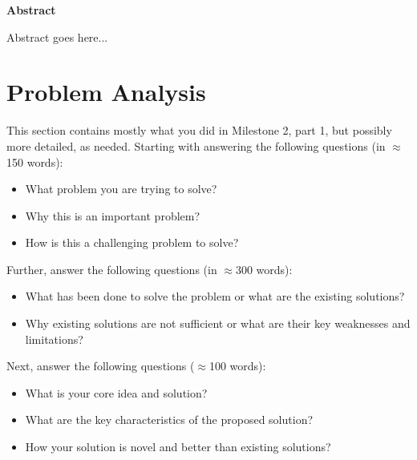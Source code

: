 \documentclass[12pt]{article}
\begin{document}
\clearpage\thispagestyle{empty}

	\vspace{1cm}
		\begin{center}
\textbf{Abstract}\\
		\end{center}
	\vspace{1cm}
{\normalsize Abstract goes here...\par}
\clearpage\thispagestyle{empty}
\tableofcontents{}
\clearpage\thispagestyle{empty}

\section{Problem Analysis}\label{chap:introduction}

This section contains mostly what you did in Milestone 2, part 1, but possibly more detailed, as needed. 
Starting with answering the following questions (in $\approx$150 words):
\begin{itemize}
    \item What problem you are trying to solve? 
    \item Why this is an important problem?
    \item How is this a challenging problem to solve? 
\end{itemize}

Further, answer the following questions (in $\approx$300 words):
\begin{itemize}
    \item What has been done to solve the problem or what are the existing solutions?
    \item Why existing solutions are not sufficient or what are their key weaknesses and limitations?
\end{itemize}

Next, answer the following questions ($\approx$100 words):
\begin{itemize}
    \item What is your core idea and solution? 
    \item What are the key characteristics of the proposed solution? 
    \item How your solution is novel and better than existing solutions? 
\end{itemize}
\end{document}

